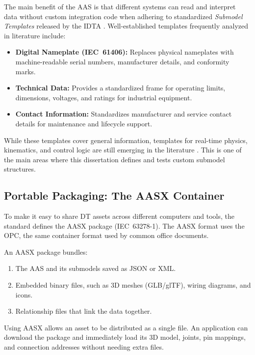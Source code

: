The main benefit of the \gls{AAS} is that different systems can read and interpret data without custom integration code when adhering to standardized \textit{Submodel Templates} released by the \gls{IDTA} \cite{Abdel-Aty2022,Ahvanouee2025}. Well-established templates frequently analyzed in literature include:
\begin{itemize}
    \item \textbf{Digital Nameplate (\gls{IEC}~61406):} Replaces physical nameplates with machine-readable serial numbers, manufacturer details, and conformity marks.
    \item \textbf{Technical Data:} Provides a standardized frame for operating limits, dimensions, voltages, and ratings for industrial equipment.
    \item \textbf{Contact Information:} Standardizes manufacturer and service contact details for maintenance and lifecycle support.
\end{itemize}

While these templates cover general information, templates for real-time physics, kinematics, and control logic are still emerging in the literature \cite{Pajpach2025,Perez2025}. This is one of the main areas where this dissertation defines and tests custom submodel structures.

\subsection{Portable Packaging: The \texorpdfstring{\gls{AASX}}{AASX} Container}

To make it easy to share \gls{DT} assets across different computers and tools, the standard defines the \gls{AASX} package (\gls{IEC}~63278-1). The \gls{AASX} format uses the \gls{OPC}, the same container format used by common office documents.

An \gls{AASX} package bundles:
\begin{enumerate}
    \item The \gls{AAS} and its submodels saved as \gls{JSON} or \gls{XML}.
    \item Embedded binary files, such as 3D meshes (\gls{GLB}/\gls{glTF}), wiring diagrams, and icons.
    \item Relationship files that link the data together.
\end{enumerate}

Using \gls{AASX} allows an asset to be distributed as a single file. An application can download the package and immediately load its 3D model, joints, pin mappings, and connection addresses without needing extra files.

